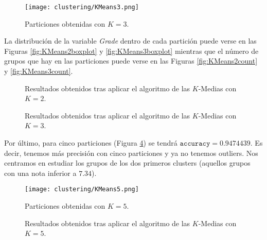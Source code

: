 \begin{figure}[H]
    \centering
    \texttt{[image: clustering/KMeans3.png]}
    \caption{Particiones obtenidas con $K = 3$.}
    \label{fig:KMeans3}
\end{figure}

La distribución de la variable \emph{Grade} dentro de cada partición puede verse en las Figuras \ref{fig:KMeans2boxplot} y \ref{fig:KMeans3boxplot} mientras que el número de grupos que hay en las particiones puede verse en las Figuras \ref{fig:KMeans2count} y \ref{fig:KMeans3count}.

\begin{figure}[H]
\centering
{}\qquad
{}%
\caption{Resultados obtenidos tras aplicar el algoritmo de las $K$-Medias con $K = 2$.}
\label{fig:KMeans2details}
\end{figure}

\begin{figure}[H]
\centering
{}\qquad
{}%
\caption{Resultados obtenidos tras aplicar el algoritmo de las $K$-Medias con $K = 3$.}
\label{fig:KMeans3details}
\end{figure}

Por último, para cinco particiones (Figura \ref{fig:KMeans5}) se tendrá $\texttt{accuracy} = 0.9474439$. Es decir, tenemos más precisión con cinco particiones y ya no tenemos outliers. Nos centramos en estudiar los grupos de los dos primeros clusters (aquellos grupos con una nota inferior a $7.34$).

\begin{figure}[H]
    \centering
    \texttt{[image: clustering/KMeans5.png]}
    \caption{Particiones obtenidas con $K = 5$.}
    \label{fig:KMeans5}
\end{figure}

\begin{figure}[H]
\centering
{}\qquad
{}%
\caption{Resultados obtenidos tras aplicar el algoritmo de las $K$-Medias con $K = 5$.}
\label{fig:KMeans5details}
\end{figure}

